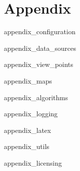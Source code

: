 \chapter{Appendix}
\label{sec:appendix}

 {appendix_configuration}

 {appendix_data_sources}

 {appendix_view_points}

 {appendix_maps}

 {appendix_algorithms}

 {appendix_logging}

 {appendix_latex}

 {appendix_utils}

 {appendix_licensing}

